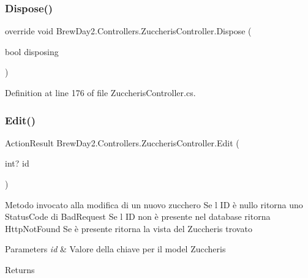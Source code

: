 \subsubsection{\texorpdfstring{Dispose()}{Dispose()}}
{\footnotesize\ttfamily override void Brew\+Day2.\+Controllers.\+Zuccheris\+Controller.\+Dispose (\begin{DoxyParamCaption}\item[{bool}]{disposing }\end{DoxyParamCaption})\hspace{0.3cm}{\ttfamily [protected]}}



Definition at line 176 of file Zuccheris\+Controller.\+cs.

\mbox{\label{class_brew_day2_1_1_controllers_1_1_zuccheris_controller_a65fd03bfe14dab909536be6441b7e5a8}} 
\subsubsection{\texorpdfstring{Edit()}{Edit()}\hspace{0.1cm}{\footnotesize\ttfamily [1/2]}}
{\footnotesize\ttfamily Action\+Result Brew\+Day2.\+Controllers.\+Zuccheris\+Controller.\+Edit (\begin{DoxyParamCaption}\item[{int?}]{id }\end{DoxyParamCaption})}



Metodo invocato alla modifica di un nuovo zucchero Se l\textquotesingle{} ID è nullo ritorna uno Status\+Code di Bad\+Request Se l\textquotesingle{} ID non è presente nel database ritorna Http\+Not\+Found Se è presente ritorna la vista del Zuccheris trovato 
\begin{DoxyParams}{Parameters}
{\em id} & Valore della chiave per il model Zuccheris\\
\hline
\end{DoxyParams}
\begin{DoxyReturn}{Returns}

\end{DoxyReturn}




